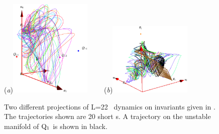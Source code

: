 \begin{figure}[t]
\begin{center}
  (\textit{a})\includegraphics[width=0.35\textwidth]{../figs/ksSO2inv134.eps}
~~~~(\textit{b})\includegraphics[width=0.35\textwidth]{../figs/ksSO2inv145.eps}
\end{center}
\caption[KSe SO(2) reduced phase space with second set of modified invariants.]{ Two different projections
of L=22 \KS\ dynamics on invariants given in . The trajectories shown are 20 short \rpo s. A trajectory on the unstable manifold of $\mathrm{Q}_{1}$ is shown in black.}
\label{fig:SO2inv}
\end{figure}
